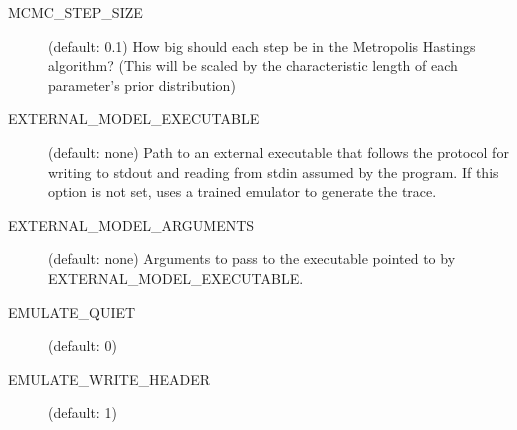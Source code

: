 \begin{description}
    \item[MCMC\_STEP\_SIZE] (default: 0.1) How big should each step be in the Metropolis Hastings algorithm? (This will be scaled by the characteristic length of each parameter's prior distribution)
    \item[EXTERNAL\_MODEL\_EXECUTABLE] (default: none) Path to an external executable that follows the protocol for writing to stdout and reading from stdin assumed by the  program. If this option is not set,  uses a trained emulator to generate the trace.
    \item[EXTERNAL\_MODEL\_ARGUMENTS] (default: none) Arguments to pass to the executable pointed to by EXTERNAL\_MODEL\_EXECUTABLE.
    \item[EMULATE\_QUIET] (default: 0)
    \item[EMULATE\_WRITE\_HEADER] (default: 1)
\end{description}

